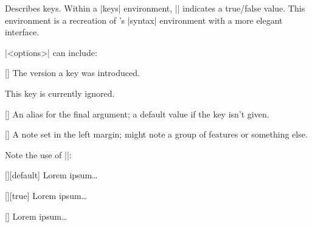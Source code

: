 \documentclass{ltxguidex}
\begin{document}
Describes keys. Within a |keys| environment, |\bool| indicates a true/false
value. This environment is a recreation of 's |syntax|
environment with a more elegant interface.

|<options>| can include:

\begin{keys}
	[]
	The version a key was introduced.

	\begin{warning}
		This key is currently ignored.
	\end{warning}

	[]
	An alias for the final argument; a default value if the key isn't
	given.

	[]
	A note set in the left margin; might note a group of features or
	something else.
\end{keys}

\begin{example}
	Note the use of |\bool|:
\begin{LTXexample}
\begin{keys}
      [][default]
  Lorem ipsum\dots

  [\bool][true]
  Lorem ipsum\dots

  []
  Lorem ipsum\dots
\end{keys}
\end{LTXexample}
\end{example}
\end{document}
